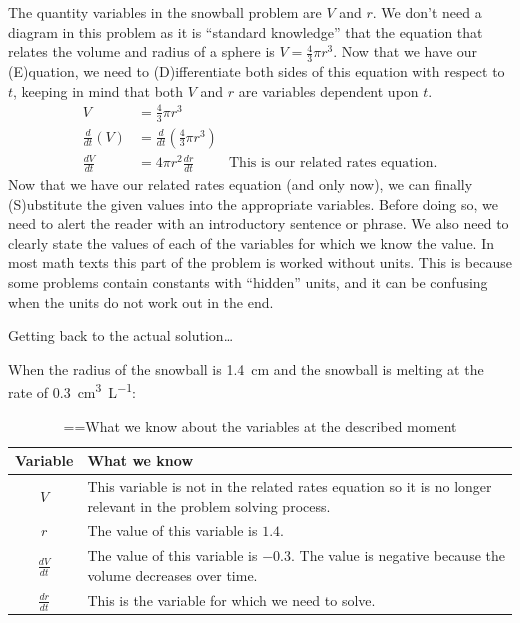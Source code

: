 \documentclass[10pt,oneside,]{book}
\newcommand{\acronym}[1]{#1}
\theoremstyle{plain}
\theoremstyle{definition}
\numberwithin{equation}{section}
\newcommand{\lz}[2]{\frac{d#1}{d#2}}
\newcommand{\lzoo}[2]{{\frac{d}{d#1}}{\left(#2\right)}}
\begin{document}
The quantity variables in the snowball problem are \(V\) and \(r\). We don't need a diagram in this problem as it is ``standard knowledge'' that the equation that relates the volume and radius of a sphere is \(V=\frac{4}{3}\pi r^3\). Now that we have our (\acronym{E})quation, we need to (\acronym{D})ifferentiate both sides of this equation with respect to \(t\), keeping in mind that both \(V\) and \(r\) are variables dependent upon \(t\).\begin{align*}
V&=\frac{4}{3}\pi r^3\\
\lzoo{t}{V}&=\lzoo{t}{\frac{4}{3}\pi r^3}\\
\lz{V}{t}&=4\pi r^2\lz{r}{t}&\text{This is our related rates equation.}
\end{align*}Now that we have our related rates equation (and only now), we can finally (\acronym{S})ubstitute the given values into the appropriate variables. Before doing so, we need to alert the reader with an introductory sentence or phrase. We also need to clearly state the values of each of the variables for which we know the value. In most math texts this part of the problem is worked without units. This is because some problems contain constants with ``hidden'' units, and it can be confusing when the units do not work out in the end.%
\par
Getting back to the actual solution\dots{}%
\par
When the radius of the snowball is \SI{1.4}{\centi\meter} and the snowball is melting at the rate of \SI{0.3}{\centi\meter\tothe{3}\per\liter}:%
\begin{table}
\centering
\caption{\binoppenalty=\maxdimen \relpenalty=\maxdimen What we know about the variables at the described moment\label{table-snowball-what-we-know}}
\begin{tabular}{cp{4in}}
\toprule
Variable&What we know\\
\midrule
\(V\)&This variable is not in the related rates equation so it is no longer relevant in the problem solving process.\\
\midrule
\(r\)&The value of this variable is \(1.4\).\\
\midrule
\(\lz{V}{t}\)&The value of this variable is \(-0.3\). The value is negative because the volume decreases over time.\\
\midrule
\(\lz{r}{t}\)&This is the variable for which we need to solve.\\
\bottomrule
\end{tabular}
\end{table}
\par
\end{document}
